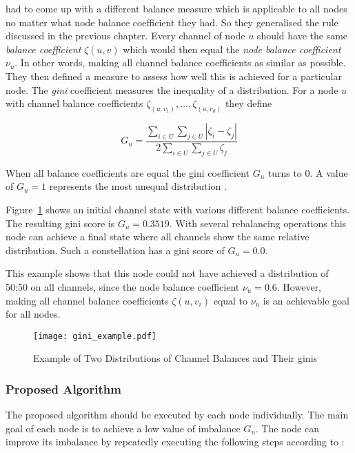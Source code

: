 \documentclass[final]{fhnwreport}       %
\begin{document}
\citeauthor{pickhardt_imbalance_2019} had to come up with a different balance measure which is applicable to all nodes no matter what node balance coefficient they had. So they generalised the rule discussed in the previous chapter. Every channel of node $u$ should have the same \emph{balance coefficient} $\zeta{(u,v)}$ which would then equal the \emph{node balance coefficient} $\nu_u$. In other words, making all channel balance coefficients as similar as possible. They then defined a measure to assess how well this is achieved for a particular node. The \emph{\gls{gini}} coefficient measures the inequality of a distribution. For a node $u$ with channel balance coefficients $\zeta_{(u,v_1)},\dots,\zeta_{(u,v_d)}$ they define

$$G_u = \frac{\displaystyle{\sum_{i\in U} \sum_{j \in U}} | \zeta_i - \zeta_j |}{2 \displaystyle{\sum_{i \in U} \sum_{j \in U} \zeta_j}}$$

When all balance coefficients are equal the \gls{gini} coefficient $G_u$ turns to $0$. A value of $G_u=1$ represents the most unequal distribution \citep{pickhardt_imbalance_2019}.

Figure~\ref{fig:gini_example} shows an initial channel state with various different balance coefficients. The resulting \gls{gini} score is $G_u=0.3519$. With several rebalancing operations this node can achieve a final state where all channels show the same relative distribution. Such a constellation has a \gls{gini} score of $G_u=0.0$. 

This example shows that this node could not have achieved a distribution of 50:50 on all channels, since the node balance coefficient $\nu_u = 0.6$. However, making all channel balance coefficients $\zeta{(u,v_i)}$ equal to $\nu_u$ is an achievable goal for all nodes. 

\begin{figure}[H]
\centering
\texttt{[image: gini\_example.pdf]}
\caption{Example of Two Distributions of Channel Balances and Their \gls{gini}s}
\label{fig:gini_example}
\end{figure}


\subsubsection{Proposed Algorithm}\label{subsec:prop_algo}
The proposed algorithm should be executed by each node individually. The main goal of each node is to achieve a low value of imbalance $G_u$. The node can improve its imbalance by repeatedly executing the following steps according to \cite{pickhardt_imbalance_2019}:
\end{document}
